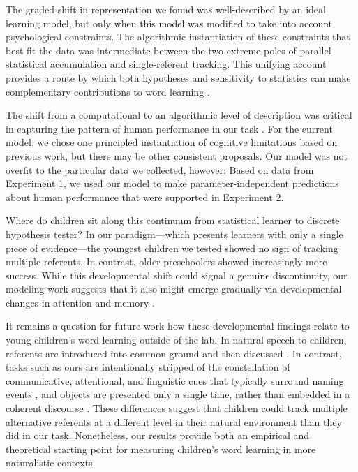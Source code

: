 \documentclass[man,floatsintext]{apa6}
\begin{document}
The graded shift in representation we found was well-described by an ideal learning model, but only when this model was modified to take into account psychological constraints. The algorithmic instantiation of these constraints that best fit the data was intermediate between the two extreme poles of parallel statistical accumulation and single-referent tracking. This unifying account provides a route by which both hypotheses and sensitivity to statistics can make complementary contributions to word learning \cite{Waxman2009,Kachergis2013}. 

The shift from a computational to an algorithmic level of description was critical in capturing the pattern of human performance in our task \cite{Marr1982,Frank2010a,Yurovsky2012c}. For the current model, we chose one principled instantiation of cognitive limitations based on previous work, but there may be other consistent proposals. Our model was not overfit to the particular data we collected, however: Based on data from Experiment 1, we used our model to make parameter-independent predictions about human performance that were supported in Experiment 2.

Where do children sit along this continuum from statistical learner to discrete hypothesis tester? In our paradigm---which presents learners with only a single piece of evidence---the youngest children we tested showed no sign of tracking multiple referents. In contrast, older preschoolers showed increasingly more success. While this developmental shift could signal a genuine discontinuity, our modeling work suggests that it also might emerge gradually via developmental changes in attention and memory \cite{Yu2011a,Vlach2013}.

It remains a question for future work how these developmental findings relate to young children's word learning outside of the lab. In natural speech to children, referents are introduced into common ground and then discussed \cite{Clark2003}. In contrast, tasks such as ours are intentionally stripped of the constellation of communicative, attentional, and linguistic cues that typically surround naming events \cite{Frank2013a, Gogate2010, Mintz2003}, and objects are presented only a single time, rather than embedded in a coherent discourse \cite{Frank2013a, Rohde2013}. These differences suggest that children could track multiple alternative referents at a different level in their natural environment than they did in our task. Nonetheless, our results provide both an empirical and theoretical starting point for measuring children's word learning in more naturalistic contexts.
\end{document}
